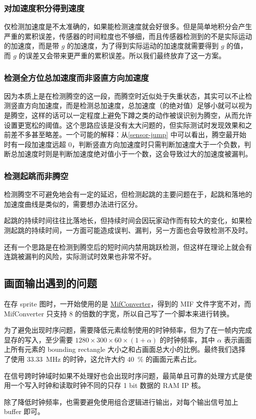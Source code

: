 \documentclass[UTF8, 11pt, fontset=none]{ctexart}
\begin{document}
\subsubsection{对加速度积分得到速度}

仅检测加速度是不太准确的，如果能检测速度就会好很多。但是简单地积分会产生严重的累积误差，传感器的时间粒度也不够细，而且传感器检测到的不是实际运动的加速度，而是带 $g$ 的加速度，为了得到实际运动的加速度就需要得到 $g$ 的值，而 $g$ 的误差又会带来更严重的累积误差。所以我们最终放弃了这一方案。

\subsubsection{检测全方位总加速度而非竖直方向加速度}

因为本质上是在检测腾空的这一段，而腾空时近似处于失重状态，其实可以不止检测竖直方向加速度，而是检测总加速度，总加速度（的绝对值）足够小就可以视为是腾空，这样的话可以一定程度上避免下蹲之类的动作被误识别为腾空，从而允许设置更宽松的阈值。这个思路应该是没有太大问题的，但实际测试时发现效果和之前差不多甚至略差。一个可能的解释：从\cref{sensor-jump} 中可以看出，腾空最开始时有一段加速度远超 $0$，判断竖直方向加速度时只需判断加速度大于一个负数，判断总加速度时则是判断加速度绝对值小于一个数，这会导致过大的加速度被漏判。

\subsubsection{检测起跳而非腾空}

检测腾空不可避免地会有一定的延迟，但检测起跳的主要问题在于，起跳和落地的加速度曲线是类似的，需要想办法进行区分。

起跳的持续时间往往比落地长，但持续时间会因玩家动作而有较大的变化，如果检测起跳的持续时间，一方面可能造成误判、漏判，另一方面也会导致检测不及时。

还有一个思路是在检测到腾空后的短时间内禁用跳跃检测，但这样在理论上就会有连跳被漏判的风险，实际测试时效果也非常不好。

\subsection{画面输出遇到的问题}

在存 sprite 图时，一开始使用的是 \href{https://github.com/thu-cs-lab/MifConverter}{MifConverter}，得到的 MIF 文件字宽不对，而 MifConverter 只支持 8 的倍数的字宽，所以自己写了一个脚本来进行转换。

为了避免出现时序问题，需要降低元素绘制使用的时钟频率，但为了在一帧内完成显存的写入，至少需要 $1280 \times 300 \times 60 \times (1+\alpha)$ 的时钟频率，其中 $\alpha$ 表示画面上所有元素的 bounding rectangle 大小之和占画面总大小的比例。最终我们选择了使用 \SI{33.33}{\mega\hertz} 的时钟，这允许大约 \SI{40}{\percent} 的画面元素占比。

在信号跨时钟域时如果不处理好也会出现时序问题，最简单且可靠的处理方式是使用一个写入时钟和读取时钟不同的只存 1 bit 数据的 RAM IP 核。

除了降低时钟频率，也需要避免使用组合逻辑进行输出，对每个输出信号加上 buffer 即可。
\end{document}
